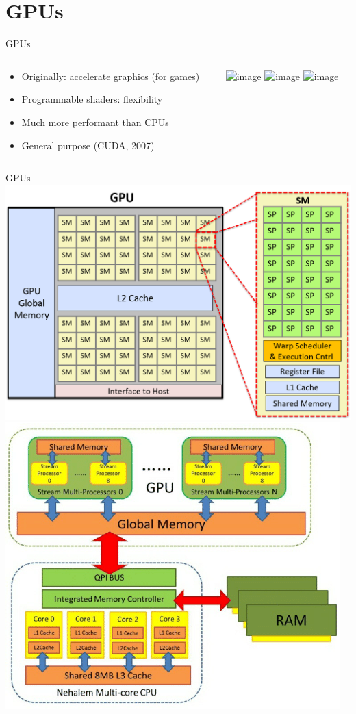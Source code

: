 \section{GPUs}\label{sec:gpus}
\mkAgenda
\begin{frame}{GPUs}
    \begin{columns}
        \begin{column}{0.4\textwidth}
            \begin{itemize}
                \item<1-> Originally: accelerate graphics (for games)
                \item<2-> Programmable shaders: flexibility
                \item<3-> Much more performant than CPUs
                \item<4-> General purpose (CUDA, 2007)
            \end{itemize}
        \end{column}

        \begin{column}{0.5\textwidth}
            \includegraphics<1-2>[width=0.7\linewidth]{./figures/geforce_256}
            \includegraphics<1-2>[width=0.7\linewidth]{./figures/rtx4090}
            \includegraphics<4>[width=0.9\linewidth]{./figures/applications}
        \end{column}
    \end{columns}
\end{frame}

\begin{frame}{GPUs}
    \center
    \includegraphics[width=0.45\linewidth]{./figures/arch}
    \includegraphics[width=0.45\linewidth]{./figures/interaction}
\end{frame}